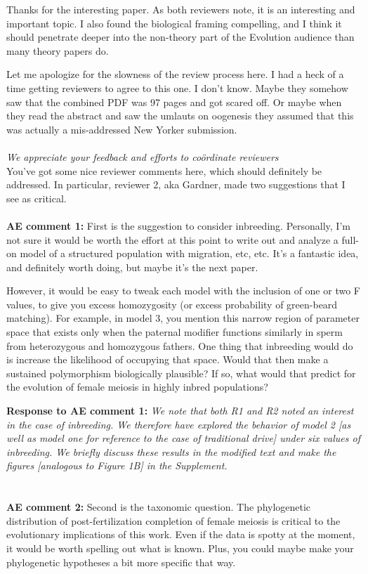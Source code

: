 \documentclass[12pt,letterpaper]{article}
\begin{document}
Thanks for the interesting paper. As both reviewers note, it is an interesting and important topic. I also found the biological framing compelling, and I think it should penetrate deeper into the non-theory part of the Evolution audience than many theory papers do.

Let me apologize for the slowness of the review process here. I had a heck of a time getting reviewers to agree to this one. I don't know. Maybe they somehow saw that the combined PDF was 97 pages and got scared off. Or maybe when they read the abstract and saw the umlauts on oogenesis they assumed that this was actually a mis-addressed New Yorker submission.
\\ \\
\emph{We appreciate your feedback and efforts to co\"{o}rdinate reviewers}
\\

You've got some nice reviewer comments here, which should definitely be addressed. In particular, reviewer 2, aka Gardner, made two suggestions that I see as critical.
\\ \\
{\bf{AE comment 1:}} First is the suggestion to consider inbreeding. Personally, I'm not sure it would be worth the effort at this point to write out and analyze a full-on model of a structured population with migration, etc, etc. It's a fantastic idea, and definitely worth doing, but maybe it's the next paper.

However, it would be easy to tweak each model with the inclusion of one or two F values, to give you excess homozygosity (or excess probability of green-beard matching). For example, in model 3, you mention this narrow region of parameter space that exists only when the paternal modifier functions similarly in sperm from heterozygous and homozygous fathers. One thing that inbreeding would do is increase the likelihood of occupying that space. Would that then make a sustained polymorphism biologically plausible? If so, what would that predict for the evolution of female meiosis in highly inbred populations?

{\bf{Response to AE comment 1:}}  \emph{We note that both R1 and R2 noted an interest in the case of inbreeding. We therefore have explored the behavior of model 2 [as well as model one for reference to the case of traditional drive] under six values of inbreeding. We briefly discuss these results in the modified text and make the figures [analogous to Figure 1B] in the Supplement.}
\\
\\
\\
{\bf{AE comment 2:}} Second is the taxonomic question. The phylogenetic distribution of post-fertilization completion of female meiosis is critical to the evolutionary implications of this work. Even if the data is spotty at the moment, it would be worth spelling out what is known. Plus, you could maybe make your phylogenetic hypotheses a bit more specific that way.
\end{document}
